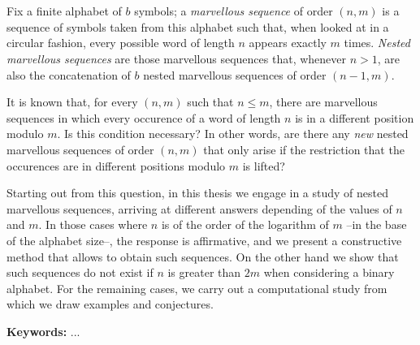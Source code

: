 \chapter*{\runtitle}

Fix a finite alphabet of $b$ symbols; a \emph{marvellous sequence} of
order $(n,m)$ is a sequence of symbols taken from this alphabet such that,
when looked at in a circular fashion, every possible word of length $n$ appears
exactly $m$ times.
\emph{Nested marvellous sequences} are those marvellous sequences that, whenever
$n > 1$, are also the concatenation of $b$ nested marvellous sequences of order
$(n-1,m)$.

It is known that, for every $(n,m)$ such that $n \leq m$, there are marvellous
sequences in which every occurence of a word of length $n$ is in a different
position modulo $m$. Is this condition necessary? In other words,
are there any \emph{new} nested marvellous sequences of order $(n,m)$ that only
arise if the restriction that the occurences are in different positions modulo
$m$ is lifted?

Starting out from this question, in this thesis we engage in a study of nested
marvellous sequences, arriving at different answers depending of the values of
$n$ and $m$. In those cases where $n$ is of the order of the logarithm of $m$
--in the base of the alphabet size--, the response is affirmative, and we
present a constructive method that allows to obtain such sequences. On the other
hand we show that such sequences do not exist if $n$ is greater than $2m$
when considering a binary alphabet.
For the remaining cases, we carry out a computational study from which we
draw examples and conjectures.

\bigskip

\noindent\textbf{Keywords:} ...